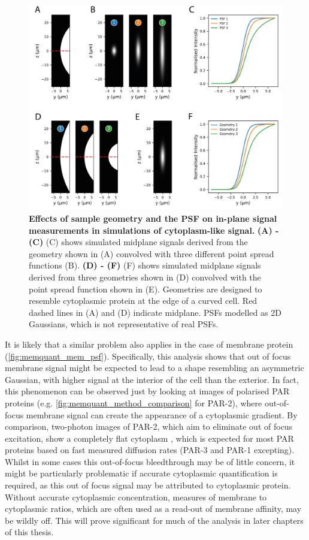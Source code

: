 \documentclass[12pt]{"report"}
\newcommand{\mycaption}[2]{\caption[#1]{\textbf{#1.} #2}}
\begin{document}
\begin{figure}
\includegraphics[scale=0.9]{memquant_cyt_psf}
\centering
\mycaption{Effects of sample geometry and the PSF on in-plane signal measurements in simulations of cytoplasm-like signal}{
\textbf{(A) - (C)} (C) shows simulated midplane signals derived from the geometry shown in (A) convolved with three different point spread functions (B).
\textbf{(D) - (F)} (F) shows simulated midplane signals derived from three geometries shown in (D) convolved with the point spread function shown in (E). Geometries are designed to resemble cytoplasmic protein at the edge of a curved cell. Red dashed lines in (A) and (D) indicate midplane. PSFs modelled as 2D Gaussians, which is not representative of real PSFs.
}
\label{fig:memquant_cyt_psf}
\end{figure}

It is likely that a similar problem also applies in the case of membrane protein (\cref{fig:memquant_mem_psf}). Specifically, this analysis shows that out of focus membrane signal might be expected to lead to a shape resembling an asymmetric Gaussian, with higher signal at the interior of the cell than the exterior. In fact, this phenomenon can be observed just by looking at images of polarised PAR proteins (e.g. \cref{fig:memquant_method_comparison} for PAR-2), where out-of-focus membrane signal can create the appearance of a cytoplasmic gradient. By comparison, two-photon images of PAR-2, which aim to eliminate out of focus excitation, show a completely flat cytoplasm \citep{Petrasek2008}, which is expected for most PAR proteins based on fast measured diffusion rates (PAR-3 and PAR-1 excepting). Whilst in some cases this out-of-focus bleedthrough may be of little concern, it might be particularly problematic if accurate cytoplasmic quantification is required, as this out of focus signal may be attributed to cytoplasmic protein. Without accurate cytoplasmic concentration, measures of membrane to cytoplasmic ratios, which are often used as a read-out of membrane affinity, may be wildly off. This will prove significant for much of the analysis in later chapters of this thesis.\\
\end{document}
